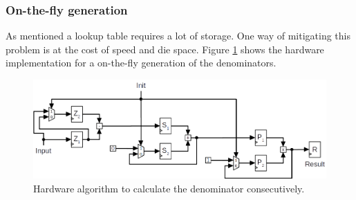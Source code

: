 \subsubsection{On-the-fly generation}
As mentioned a lookup table requires a lot of storage. One way of mitigating
this problem is at the cost of speed and die space. Figure
\ref{fig:x-algo:on-the-fly} shows the hardware implementation for a on-the-fly
generation of the denominators.

\begin{figure}[H]
	\centering
	\includegraphics[width=.8\textwidth]{content/results/x-algo_on-the-fly.png}
	\caption{Hardware algorithm to calculate the denominator consecutively.}
	\label{fig:x-algo:on-the-fly}
\end{figure}
